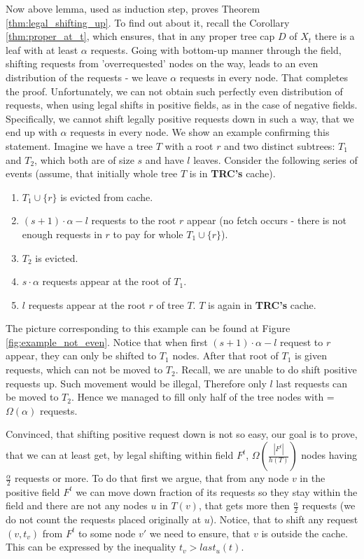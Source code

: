 Now above lemma, used as induction step, proves Theorem 
\ref{thm:legal_shifting_up}. To find out about it, recall the Corollary 
\ref{thm:proper_at_t}, which ensures, that in any proper tree cap $D$ of 
$X_t$ there is a leaf with at least $\alpha$ requests. Going with bottom-up 
manner through the field, shifting requests from 'overrequested' nodes on the 
way, leads to an even distribution of the requests - we leave $\alpha$ requests 
in every node. That completes the proof.   
Unfortunately, we can not obtain such perfectly even distribution of requests,
 when using legal shifts in positive fields, as in the case of negative fields. 
Specifically, we cannot shift legally positive requests down in such a way, that
 we end up with $\alpha$ requests in every node. We show an example confirming 
this statement. Imagine we have a tree $T$ with a root $r$ and two distinct 
subtrees: $T_1$ and $T_2$, which both are of size $s$ and have $l$ leaves. 
Consider the following series of events (assume, that initially whole tree $T$ 
is in \textbf{TRC's} cache).
\begin{enumerate}
 \item $T_1 \cup \{r\}$ is evicted from cache.
 \item $(s+1) \cdot \alpha - l$ requests to the root $r$ appear (no fetch 
occurs - there is not enough requests in $r$ to pay for whole $T_1 \cup \{r\}$).
 \item $T_2$ is evicted.
 \item $s \cdot \alpha$ requests appear at the root of $T_1$.
 \item $l$ requests appear at the root $r$ of tree $T$. $T$ is again in 
\textbf{TRC's} cache.
\end{enumerate}

The picture corresponding to this example can be found at Figure 
\ref{fig:example_not_even}. 
Notice that when first $(s+1) \cdot \alpha - l$ request to $r$ appear, they can 
only be shifted to $T_1$ nodes. After that root of $T_1$ is given requests, 
which can not be moved to $T_2$. Recall, we are unable to do shift positive 
requests up. Such movement would be illegal, Therefore only $l$ last requests 
can be moved to $T_2$. Hence we managed to fill only half of the tree nodes 
with =$\Omega(\alpha)$ requests.   

Convinced, that shifting positive request down is not so easy, our goal is to 
prove, that we can at least get, by legal shifting within field $F^t$, 
$\Omega(\frac{|F^t|}{h(T)})$ nodes having $\frac{\alpha}{2}$ 
requests or more. To do that first we argue, that from any node $v$ in the 
positive field $F^t$ we can move down fraction of its requests so they stay 
within the field and there are not any nodes $u$ in $T(v)$, that gets more then 
$\frac{\alpha}{2}$ requests (we do not count the requests placed originally at 
$u$). Notice, that to shift any request $(v, t_v)$ from $F^t$ to some node $v'$ 
we need to ensure, that $v$ is outside the cache. This can be expressed by 
the inequality $t_v > last_u(t)$.

